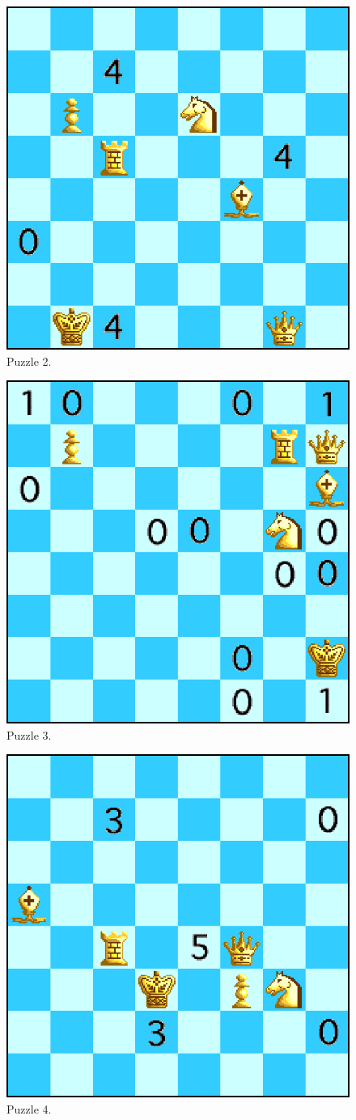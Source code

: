 \documentclass[runningheads]{llncs}
\begin{document}
\begin{figure}[H]
  \centering
  \includegraphics[width=0.6\linewidth]{figures/chess2.eps}
  \caption{Puzzle 2.}\label{fig:puzzle2}
\end{figure}

\begin{figure}[H]
  \centering
  \includegraphics[width=0.6\linewidth]{figures/chess3.eps}
  \caption{Puzzle 3.}\label{fig:puzzle3}
\end{figure}

\begin{figure}[H]
  \centering
  \includegraphics[width=0.6\linewidth]{figures/chess4.eps}
  \caption{Puzzle 4.}\label{fig:puzzle4}
\end{figure}
\end{document}
